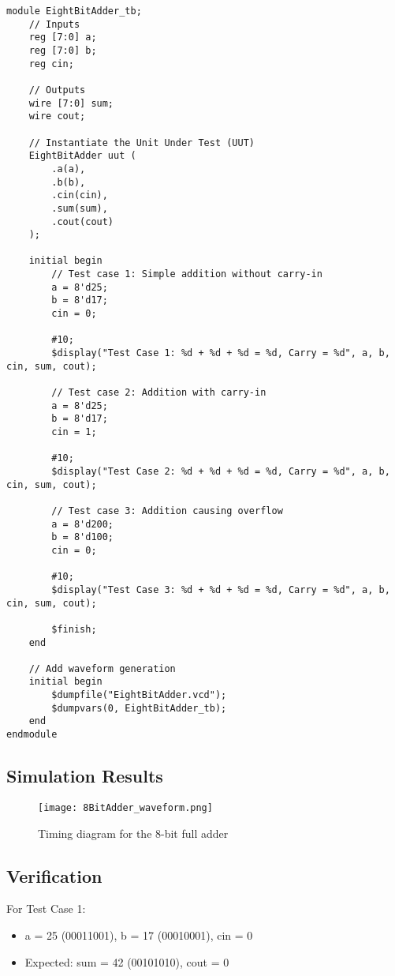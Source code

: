 \documentclass{article}
\begin{document}
\begin{lstlisting}
module EightBitAdder_tb;
    // Inputs
    reg [7:0] a;
    reg [7:0] b;
    reg cin;
    
    // Outputs
    wire [7:0] sum;
    wire cout;
    
    // Instantiate the Unit Under Test (UUT)
    EightBitAdder uut (
        .a(a),
        .b(b),
        .cin(cin),
        .sum(sum),
        .cout(cout)
    );
    
    initial begin
        // Test case 1: Simple addition without carry-in
        a = 8'd25;
        b = 8'd17;
        cin = 0;
        
        #10;
        $display("Test Case 1: %d + %d + %d = %d, Carry = %d", a, b, cin, sum, cout);
        
        // Test case 2: Addition with carry-in
        a = 8'd25;
        b = 8'd17;
        cin = 1;
        
        #10;
        $display("Test Case 2: %d + %d + %d = %d, Carry = %d", a, b, cin, sum, cout);
        
        // Test case 3: Addition causing overflow
        a = 8'd200;
        b = 8'd100;
        cin = 0;
        
        #10;
        $display("Test Case 3: %d + %d + %d = %d, Carry = %d", a, b, cin, sum, cout);
        
        $finish;
    end
    
    // Add waveform generation
    initial begin
        $dumpfile("EightBitAdder.vcd");
        $dumpvars(0, EightBitAdder_tb);
    end
endmodule
\end{lstlisting}

\subsection{Simulation Results}

\begin{figure}[H]
	\centering
	\texttt{[image: 8BitAdder\_waveform.png]}
	\caption{Timing diagram for the 8-bit full adder}
	\label{fig:8BitAdder_waveform}
\end{figure}

\subsection{Verification}
For Test Case 1:
\begin{itemize}
	\item a = 25 (00011001), b = 17 (00010001), cin = 0
	\item Expected: sum = 42 (00101010), cout = 0
\end{itemize}
\end{document}

